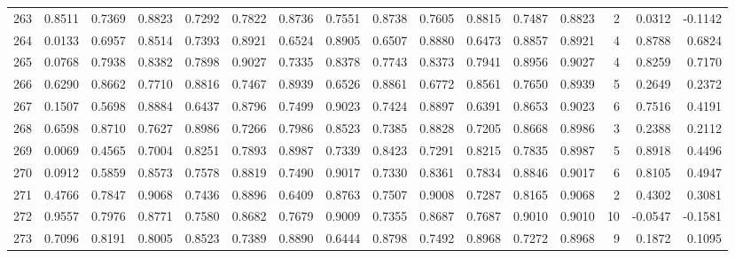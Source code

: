 \begin{tabular}{lrrrrrrrrrrrrrrr}
263 &      0.8511 &  0.7369 &  0.8823 &  0.7292 &  0.7822 &  0.8736 &  0.7551 &  0.8738 &  0.7605 &  0.8815 &   0.7487 &     0.8823 &      2 &                    0.0312 &                    -0.1142 \\
264 &      0.0133 &  0.6957 &  0.8514 &  0.7393 &  0.8921 &  0.6524 &  0.8905 &  0.6507 &  0.8880 &  0.6473 &   0.8857 &     0.8921 &      4 &                    0.8788 &                     0.6824 \\
265 &      0.0768 &  0.7938 &  0.8382 &  0.7898 &  0.9027 &  0.7335 &  0.8378 &  0.7743 &  0.8373 &  0.7941 &   0.8956 &     0.9027 &      4 &                    0.8259 &                     0.7170 \\
266 &      0.6290 &  0.8662 &  0.7710 &  0.8816 &  0.7467 &  0.8939 &  0.6526 &  0.8861 &  0.6772 &  0.8561 &   0.7650 &     0.8939 &      5 &                    0.2649 &                     0.2372 \\
267 &      0.1507 &  0.5698 &  0.8884 &  0.6437 &  0.8796 &  0.7499 &  0.9023 &  0.7424 &  0.8897 &  0.6391 &   0.8653 &     0.9023 &      6 &                    0.7516 &                     0.4191 \\
268 &      0.6598 &  0.8710 &  0.7627 &  0.8986 &  0.7266 &  0.7986 &  0.8523 &  0.7385 &  0.8828 &  0.7205 &   0.8668 &     0.8986 &      3 &                    0.2388 &                     0.2112 \\
269 &      0.0069 &  0.4565 &  0.7004 &  0.8251 &  0.7893 &  0.8987 &  0.7339 &  0.8423 &  0.7291 &  0.8215 &   0.7835 &     0.8987 &      5 &                    0.8918 &                     0.4496 \\
270 &      0.0912 &  0.5859 &  0.8573 &  0.7578 &  0.8819 &  0.7490 &  0.9017 &  0.7330 &  0.8361 &  0.7834 &   0.8846 &     0.9017 &      6 &                    0.8105 &                     0.4947 \\
271 &      0.4766 &  0.7847 &  0.9068 &  0.7436 &  0.8896 &  0.6409 &  0.8763 &  0.7507 &  0.9008 &  0.7287 &   0.8165 &     0.9068 &      2 &                    0.4302 &                     0.3081 \\
272 &      0.9557 &  0.7976 &  0.8771 &  0.7580 &  0.8682 &  0.7679 &  0.9009 &  0.7355 &  0.8687 &  0.7687 &   0.9010 &     0.9010 &     10 &                   -0.0547 &                    -0.1581 \\
273 &      0.7096 &  0.8191 &  0.8005 &  0.8523 &  0.7389 &  0.8890 &  0.6444 &  0.8798 &  0.7492 &  0.8968 &   0.7272 &     0.8968 &      9 &                    0.1872 &                     0.1095 \\

\end{tabular}
